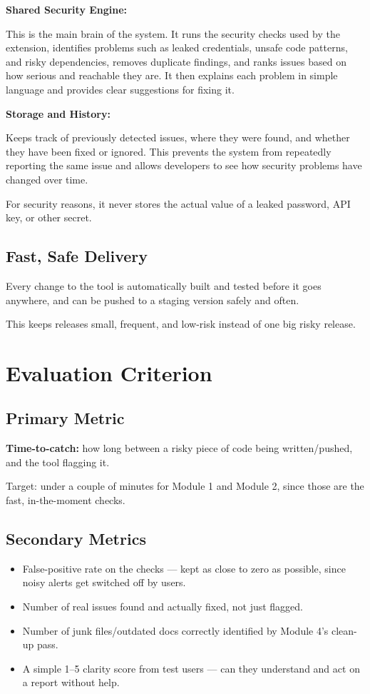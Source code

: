 \documentclass[12pt,a4paper]{article}
\begin{document}
\textbf{Shared Security Engine:}

This is the main brain of the system. It runs the security checks used by the extension, identifies problems such as leaked credentials, unsafe code patterns, and risky dependencies, removes duplicate findings, and ranks issues based on how serious and reachable they are. It then explains each problem in simple language and provides clear suggestions for fixing it.

\textbf{Storage and History:}

Keeps track of previously detected issues, where they were found, and whether they have been fixed or ignored. This prevents the system from repeatedly reporting the same issue and allows developers to see how security problems have changed over time.

For security reasons, it never stores the actual value of a leaked password, API key, or other secret.

\subsection{Fast, Safe Delivery}

Every change to the tool is automatically built and tested before it goes anywhere, and can be pushed to a staging version safely and often.

This keeps releases small, frequent, and low-risk instead of one big risky release.

\section{Evaluation Criterion}

\subsection{Primary Metric}

\textbf{Time-to-catch:} how long between a risky piece of code being written/pushed, and the tool flagging it.

Target: under a couple of minutes for Module 1 and Module 2, since those are the fast, in-the-moment checks.

\subsection{Secondary Metrics}

\begin{itemize}
    \item False-positive rate on the checks --- kept as close to zero as possible, since noisy alerts get switched off by users.

    \item Number of real issues found and actually fixed, not just flagged.

    \item Number of junk files/outdated docs correctly identified by Module 4's clean-up pass.

    \item A simple 1--5 clarity score from test users --- can they understand and act on a report without help.
\end{itemize}
\end{document}

